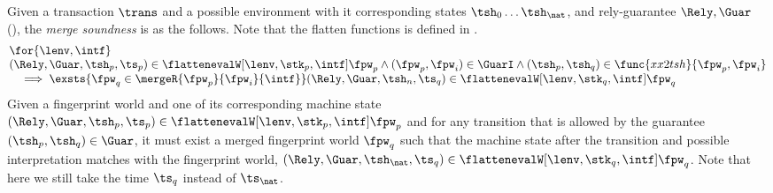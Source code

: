 \begin{lem}
\label{lem:merge-sound}
Given a transaction \( \trans \) and a possible environment with it corresponding states \( \tsh_{0} \dots \tsh_{\nat} \), and rely-guarantee \( \Rely, \Guar \) (), the \emph{merge soundness} is as the follows.
Note that the flatten functions is defined in .
\[
\begin{array}{@{}l@{}}
    \for{ \lenv, \intf}  \\
    (\Rely, \Guar, \tsh_{p}, \ts_{p}) \in \flattenevalW[\lenv, \stk_{p}, \intf]{\fpw_{p}}
    \land (\fpw_{p}, \fpw_{i} ) \in \GuarI
    \land (\tsh_{p}, \tsh_{q}) \in \func{xx2tsh}{\fpw_{p}, \fpw_{i}} \\
    \quad \implies \exsts{\fpw_{q} \in \mergeR{\fpw_{p}}{\fpw_{i}}{\intf}}
    (\Rely, \Guar, \tsh_{n}, \ts_{q}) \in \flattenevalW[\lenv, \stk_{q}, \intf]{\fpw_{q}}
\end{array}
\]
Given a fingerprint world  and one of its corresponding machine state \( (\Rely, \Guar, \tsh_{p}, \ts_{p}) \in \flattenevalW[\lenv, \stk_{p}, \intf]{\fpw_{p}} \) and for any transition that is allowed by the guarantee \( (\tsh_{p}, \tsh_{q}) \in \Guar \), it must exist a merged fingerprint world \( \fpw_{q} \) such that the machine state after the transition and possible interpretation matches with the fingerprint world, \ie \((\Rely, \Guar, \tsh_{\nat}, \ts_{q}) \in \flattenevalW[\lenv, \stk_{q}, \intf]{\fpw_{q}}\).
Note that here we still take the time \( \ts_{q} \) instead of \( \ts_{\nat} \).
\end{lem}
